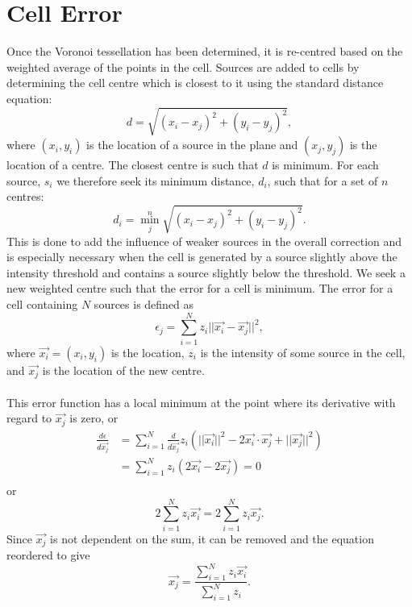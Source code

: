 \section{Cell Error}
Once the Voronoi tessellation has been determined, it is re-centred based on the weighted average of the points in the cell. Sources are added to cells by determining the cell centre which is closest to it using the standard distance equation:
\begin{equation}
d = \sqrt{(x_i - x_j)^2 + (y_i - y_j)^2},
\end{equation}
where $(x_i,y_i)$ is the location of a source in the plane and $(x_j,y_j)$ is the location of a centre. The closest centre is such that $d$ is minimum. For each source, $s_i$ we therefore seek its minimum distance, $d_i$, such that for a set of $n$ centres:
\begin{equation}
d_i = \min^n_j \sqrt{(x_i - x_j)^2 + (y_i - y_j)^2}.
\end{equation}
This is done to add the influence of weaker sources in the overall correction and is especially necessary when the cell is generated by a source slightly above the intensity threshold and contains a source slightly below the threshold. We seek a new weighted centre such that the error for a cell is minimum. The error for a cell containing $N$ sources is defined as
\begin{equation} \label{eq:cellerr}
	\epsilon_j = \sum^N_{i=1} z_i||\vec{x_i} - \vec{x_j}||^2,
\end{equation}
where $\vec{x_i} = (x_i,y_i)$ is the location, $z_i$ is the intensity of some source in the cell, and $\vec{x_j}$ is the location of the new centre. 
\\
\\
This error function has a local minimum at the point where its derivative with regard to $\vec{x_j}$ is zero, or
\begin{align*}
	\frac{d\epsilon}{d\vec{x_j}} &= \sum^N_{i=1} \frac{d}{d\vec{x_j}}z_i(||\vec{x_i}||^2 -2\vec{x_i}\cdot\vec{x_j} + ||\vec{x_j}||^2) \\
	&= \sum^N_{i=1} z_i(2\vec{x_i} - 2\vec{x_j}) = 0 \\
\end{align*}
or
\begin{equation*}
	2\sum^N_{i=1} z_i\vec{x_i} = 2\sum^N_{i=1}z_i\vec{x_j}.
\end{equation*}
Since $\vec{x_j}$ is not dependent on the sum, it can be removed and the equation reordered to give
\begin{equation}
	\vec{x_j} = \frac{\sum^N_{i=1} z_i\vec{x_i}}{\sum^N_{i=1}z_i}.
\end{equation}
